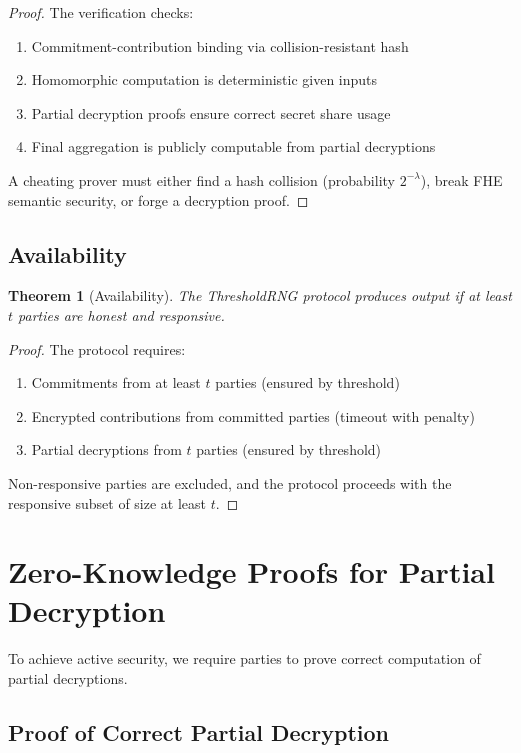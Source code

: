 \documentclass[11pt,a4paper]{article}
\newtheorem{theorem}{Theorem}[section]
\begin{document}
\begin{proof}
The verification checks:
\begin{enumerate}
    \item Commitment-contribution binding via collision-resistant hash
    \item Homomorphic computation is deterministic given inputs
    \item Partial decryption proofs ensure correct secret share usage
    \item Final aggregation is publicly computable from partial decryptions
\end{enumerate}

A cheating prover must either find a hash collision (probability $2^{-\lambda}$), break FHE semantic security, or forge a decryption proof.
\end{proof}

\subsection{Availability}

\begin{theorem}[Availability]
The ThresholdRNG protocol produces output if at least $t$ parties are honest and responsive.
\end{theorem}

\begin{proof}
The protocol requires:
\begin{enumerate}
    \item Commitments from at least $t$ parties (ensured by threshold)
    \item Encrypted contributions from committed parties (timeout with penalty)
    \item Partial decryptions from $t$ parties (ensured by threshold)
\end{enumerate}

Non-responsive parties are excluded, and the protocol proceeds with the responsive subset of size at least $t$.
\end{proof}

\section{Zero-Knowledge Proofs for Partial Decryption}

To achieve active security, we require parties to prove correct computation of partial decryptions.

\subsection{Proof of Correct Partial Decryption}
\end{document}
